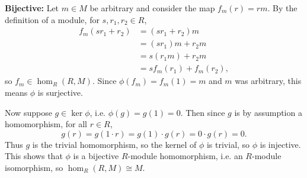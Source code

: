 \documentclass[twoside,10pt]{report}
\begin{document}
\textbf{Bijective:} Let $m \in M$ be arbitrary and consider the map $f_{m}(r) = rm$. By the definition of a module, for $s,r_1,r_2 \in R$,
\begin{align*}
	f_{m}(sr_1+r_2) &= (sr_1+r_2)m \\
			      &= (sr_1)m+r_2m \\
			      &= s(r_1m)+r_2m \\
			      &= sf_{m}(r_1)+f_{m}(r_2),
\end{align*}
so $f_{m} \in \hom_{R}(R,M)$. Since $\phi(f_{m})=f_{m}(1)=m$ and $m$ was arbitrary, this means $\phi$ is surjective.

Now suppose $g \in \ker \phi$, i.e. $\phi(g) = g(1)=0$. Then since $g$ is by assumption a homomorphism, for all $r \in R$,
\[
	g(r) = g(1\cdot r) = g(1)\cdot g(r)=0 \cdot g(r) =0.
\]
Thus $g$ is the trivial homomorphism, so the kernel of $\phi$ is trivial, so $\phi$ is injective. This shows that $\phi$ is a bijective $R$-module homomorphism, i.e. an $R$-module isomorphism, so $\hom_{R}(R,M) \cong M$.
\end{document}
